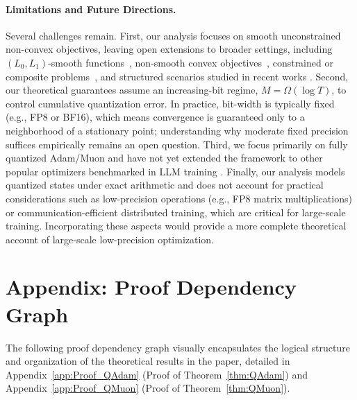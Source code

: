 \documentclass[11pt, letterpaper]{article}
\begin{document}
\paragraph{Limitations and Future Directions.}
Several challenges remain. First, our analysis focuses on smooth unconstrained non-convex objectives, leaving open extensions to broader settings, including $(L_0, L_1)$-smooth functions~\citep{zhang2020why}, non-smooth convex objectives~\citep{mishchenko2023prodigy,defazio2024the}, constrained or composite problems~\citep{kovalev2025understanding,pethick2025training}, and structured scenarios studied in recent works \citep{shen2025convergence}. Second, our theoretical guarantees assume an increasing-bit regime, $M = \Omega(\log T)$, to control cumulative quantization error. In practice, bit-width is typically fixed (e.g., FP8 or BF16), which means convergence is guaranteed only to a neighborhood of a stationary point; understanding why moderate fixed precision suffices empirically remains an open question. Third, we focus primarily on fully quantized Adam/Muon and have not yet extended the framework to other popular optimizers benchmarked in LLM training \citep{vlassis2025beyond,semenov2025benchmarking,wen2025fantastic}. Finally, our analysis models quantized states under exact arithmetic and does not account for practical considerations such as low-precision operations (e.g., FP8 matrix multiplications) or communication-efficient distributed training, which are critical for large-scale training. Incorporating these aspects would provide a more complete theoretical account of large-scale low-precision optimization.









\newpage

\appendix

\section*{Appendix: Proof Dependency Graph}

The following proof dependency graph visually encapsulates the logical structure and organization of the theoretical results in the paper, detailed in Appendix~\ref{app:Proof_QAdam} (Proof of Theorem~\ref{thm:QAdam}) and Appendix~\ref{app:Proof_QMuon} (Proof of Theorem~\ref{thm:QMuon}).
\end{document}
